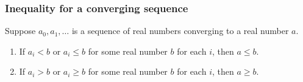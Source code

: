 \documentclass[12pt]{article}
\begin{document}
\subsubsection*{Inequality for a converging sequence}
Suppose $a_0,a_1,\ldots$ is a sequence of real numbers converging to a real 
number $a$. 
\begin{enumerate}
\item If $a_i < b$ or $a_i \le b$ 
for some real number $b$ for each $i$, then $a\le b$.
\item If $a_i > b$ or $a_i \ge b$ 
for some real number $b$ for each $i$, then $a\ge b$.
\end{enumerate}
\end{document}
